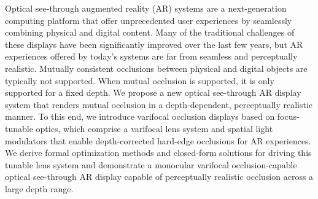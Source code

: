 Optical see-through augmented reality (AR) systems are a next-generation computing platform that offer unprecedented user experiences by seamlessly combining physical and digital content. Many of the traditional challenges of these displays have been significantly improved over the last few years, but AR experiences offered by today's systems are far from seamless and perceptually realistic. Mutually consistent occlusions between physical and digital objects are typically not supported. When mutual occlusion is supported, it is only supported for a fixed depth. We propose a new optical see-through AR display system that renders mutual occlusion in a depth-dependent, perceptually realistic manner. To this end, we introduce varifocal occlusion displays based on focus-tunable optics, which comprise a varifocal lens system and spatial light modulators that enable depth-corrected hard-edge occlusions for AR experiences. We derive formal optimization methods and closed-form solutions for driving this tunable lens system and demonstrate a monocular varifocal occlusion-capable optical see-through  AR display capable of perceptually realistic occlusion across a large depth range.
